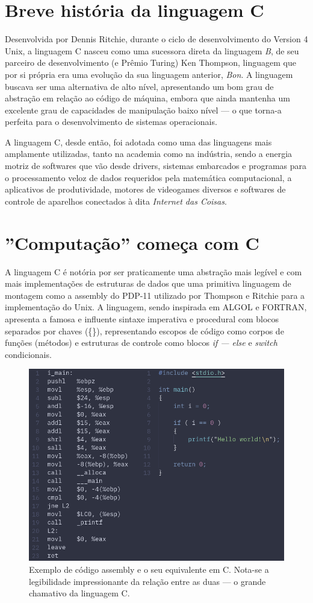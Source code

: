 \documentclass[
	12pt,				%
	openright,			%
	twoside,			%
	a4paper,			%
	english,			%
	french,				%
	spanish,			%
	brazil				%
	]{abntex2}
\begin{document}
\chapter{Breve história da linguagem C}

Desenvolvida por Dennis Ritchie, durante o ciclo de desenvolvimento do Version 4 Unix, a linguagem C nasceu como uma sucessora direta da linguagem \textit{B}, de seu parceiro de desenvolvimento (e Prêmio Turing) Ken Thompson, linguagem que por si própria era uma evolução da sua linguagem anterior, \textit{Bon}. A linguagem buscava ser uma alternativa de alto nível, apresentando um bom grau de abstração em relação ao código de máquina, embora que ainda mantenha um excelente grau de capacidades de manipulação baixo nível --- o que torna-a perfeita para o desenvolvimento de sistemas operacionais. \par
A linguagem C, desde então, foi adotada como uma das linguagens mais amplamente utilizadas, tanto na academia como na indústria, sendo a energia motriz de softwares que vão desde drivers, sistemas embarcados e programas para o processamento veloz de dados requeridos pela matemática computacional, a aplicativos de produtividade, motores de videogames diversos e softwares de controle de aparelhos conectados à dita \textit{Internet das Coisas}. \par


\chapter{''Computação'' começa com C}

A linguagem C é notória por ser praticamente uma abstração mais legível e com mais implementações de estruturas de dados que uma primitiva linguagem de montagem como a assembly do PDP-11 utilizado por Thompson e Ritchie para a implementação do Unix. A linguagem, sendo inspirada em ALGOL e FORTRAN, apresenta a famosa e influente sintaxe imperativa e procedural com blocos separados por chaves (\{\}), representando escopos de código como corpos de funções (métodos) e estruturas de controle como blocos \textit{if --- else} e \textit{switch} condicionais. \par

\begin{figure}[h]
\centering
\includegraphics[width=0.6\linewidth]{exemplo.png}
\caption{Exemplo de código assembly e o seu equivalente em C. Nota-se a legibilidade impressionante da relação entre as duas --- o grande chamativo da linguagem C.}
\label{fig:exemplo.png}
\end{figure}
\end{document}
